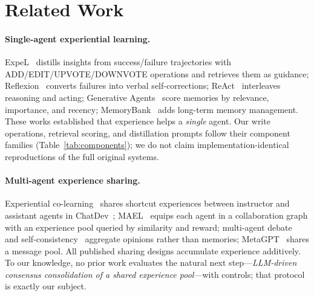 \documentclass[letterpaper]{article} %
\begin{document}
\section{Related Work}

\paragraph{Single-agent experiential learning.}
ExpeL~\citep{zhao2024expel} distills insights from success/failure trajectories with
ADD/EDIT/UPVOTE/DOWNVOTE operations and retrieves them as guidance;
Reflexion~\citep{shinn2023reflexion} converts failures into verbal self-corrections;
ReAct~\citep{yao2023react} interleaves reasoning and acting; Generative
Agents~\citep{park2023generative} score memories by relevance, importance, and recency;
MemoryBank~\citep{zhong2024memorybank} adds long-term memory management. These works
established that experience helps a \emph{single} agent. Our write operations, retrieval
scoring, and distillation prompts follow their component families
(Table~\ref{tab:components}); we do not claim implementation-identical reproductions of the
full original systems.

\paragraph{Multi-agent experience sharing.}
Experiential co-learning~\citep{qian2024colearning} shares shortcut experiences between
instructor and assistant agents in ChatDev~\citep{qian2024chatdev};
MAEL~\citep{li2025mael} equips each agent in a collaboration graph with an experience pool
queried by similarity and reward; multi-agent debate~\citep{du2024debate} and
self-consistency~\citep{wang2023selfconsistency} aggregate opinions rather than memories;
MetaGPT~\citep{hong2024metagpt} shares a message pool. All published sharing designs
accumulate experience additively. To our knowledge, no prior work evaluates the natural next
step---\emph{LLM-driven consensus consolidation of a shared experience pool}---with controls;
that protocol is exactly our subject.
\end{document}
